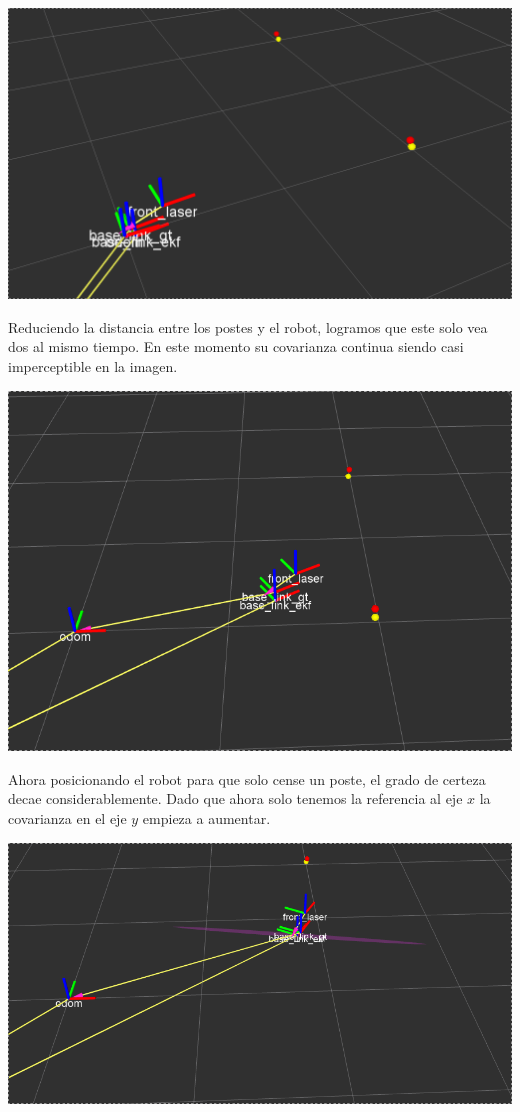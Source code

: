 \includegraphics[scale=0.3]{punto4/ekfViendoTodosLosPostes.png}

Reduciendo la distancia entre los postes y el robot, logramos que este solo vea dos al mismo tiempo. En este momento su covarianza continua siendo casi imperceptible en la imagen.

\includegraphics[scale=0.3]{punto4/ekfViendoDosPostes.png}

Ahora posicionando el robot para que solo cense un poste, el grado de certeza decae considerablemente. Dado que ahora solo tenemos la referencia al eje $x$ la covarianza en el eje $y$ empieza a aumentar.

\includegraphics[scale=0.3]{punto4/ekfViendoUnPoste.png}

